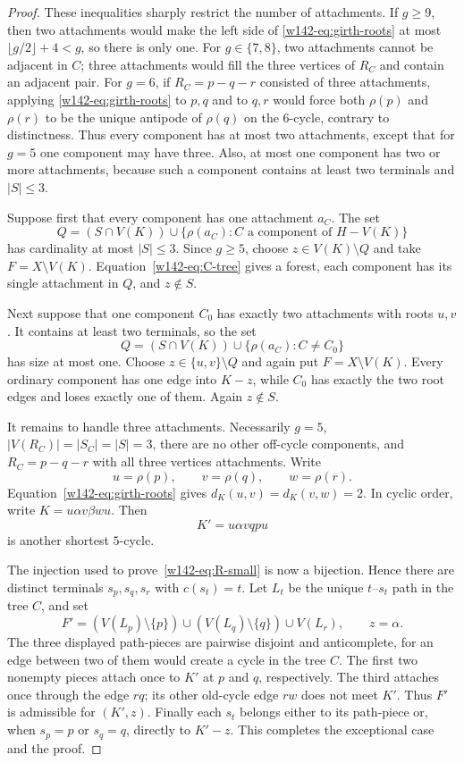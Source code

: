 \documentclass[11pt]{article}
\numberwithin{equation}{section}
\theoremstyle{remark}
\begin{document}
\begin{proof}
These inequalities sharply restrict the number of attachments.  If
$g\ge9$, then two attachments would make the left side of
\eqref{w142-eq:girth-roots} at most $\lfloor g/2\rfloor+4<g$, so there is only
one.  For $g\in\{7,8\}$, two attachments cannot be adjacent in $C$; three
attachments would fill the three vertices of $R_C$ and contain an adjacent
pair.  For $g=6$, if $R_C=p-q-r$ consisted of three attachments, applying
\eqref{w142-eq:girth-roots} to $p,q$ and to $q,r$ would force both $\rho(p)$ and
$\rho(r)$ to be the unique antipode of $\rho(q)$ on the $6$-cycle,
contrary to distinctness.  Thus every component has at most two
attachments, except that for $g=5$ one component may have three.  Also, at
most one component has two or more attachments, because such a component
contains at least two terminals and $|S|\le3$.

Suppose first that every component has one attachment $a_C$.  The set
\[
 Q=(S\cap V(K))\cup\{\rho(a_C):C\text{ a component of }H-V(K)\}
\]
has cardinality at most $|S|\le3$.  Since $g\ge5$, choose $z\in V(K)\setminus
Q$ and take $F=X\setminus V(K)$.  Equation~\eqref{w142-eq:C-tree} gives a forest,
each component has its single attachment in $Q$, and $z\notin S$.

Next suppose that one component $C_0$ has exactly two attachments with roots
$u,v$.  It contains at least two terminals, so the set
\[
 Q=(S\cap V(K))\cup
   \{\rho(a_C):C\ne C_0\}
\]
has size at most one.  Choose $z\in\{u,v\}\setminus Q$ and again put
$F=X\setminus V(K)$.  Every ordinary component has one edge into $K-z$,
while $C_0$ has exactly the two root edges and loses exactly one of them.
Again $z\notin S$.

It remains to handle three attachments.  Necessarily $g=5$,
$|V(R_C)|=|S_C|=|S|=3$, there are no other off-cycle components, and
$R_C=p-q-r$ with all three vertices attachments.  Write
\[
 u=\rho(p),\qquad v=\rho(q),\qquad w=\rho(r).
\]
Equation~\eqref{w142-eq:girth-roots} gives $d_K(u,v)=d_K(v,w)=2$.  In cyclic
order, write $K=u\alpha v\beta w u$.  Then
\[
  K'=u\alpha v q p u
\]
is another shortest $5$-cycle.

The injection used to prove~\eqref{w142-eq:R-small} is now a bijection.  Hence
there are distinct terminals $s_p,s_q,s_r$ with $c(s_t)=t$.  Let $L_t$ be
the unique $t$--$s_t$ path in the tree $C$, and set
\[
 F'=(V(L_p)\setminus\{p\})\cup
    (V(L_q)\setminus\{q\})\cup V(L_r),
 \qquad z=\alpha.
\]
The three displayed path-pieces are pairwise disjoint and anticomplete, for
an edge between two of them would create a cycle in the tree $C$.  The first
two nonempty pieces attach once to $K'$ at $p$ and $q$, respectively.  The
third attaches once through the edge $rq$; its other old-cycle edge $rw$
does not meet $K'$.  Thus $F'$ is admissible for $(K',z)$.  Finally each
$s_t$ belongs either to its path-piece or, when $s_p=p$ or $s_q=q$, directly
to $K'-z$.  This completes the exceptional case and the proof.
\end{proof}
\end{document}
